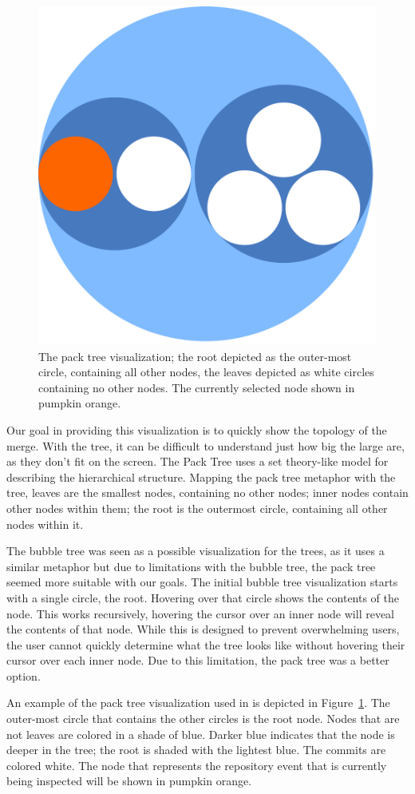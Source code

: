 \begin{figure}[htpb]
  \centering
  \includegraphics[width=0.4\linewidth]{Figures/Linvis/linvis_bubble.pdf}
  \caption{The pack tree visualization; the root depicted as the
    outer-most circle, containing all other nodes, the leaves depicted
    as white circles containing no other nodes. The currently selected
    node shown in pumpkin orange.}
  \label{fig:linvis_bubble_tree}
\end{figure}

Our goal in providing this visualization is to quickly show the topology
of the merge. With the \rt{} tree, it can be difficult to understand
just how big the large \mt{} are, as they don't fit on the screen. The
Pack Tree uses a set theory-like model for describing the hierarchical
structure. Mapping the pack tree metaphor with the tree, leaves are the
smallest nodes, containing no other nodes; inner nodes contain other
nodes within them; the root is the outermost circle, containing all
other nodes within it.

The bubble tree\cite{Boardman2000} was seen as a possible visualization
for the trees, as it uses a similar metaphor but due to limitations with
the bubble tree, the pack tree seemed more suitable with our goals. The
initial bubble tree visualization starts with a single circle, the root.
Hovering over that circle shows the contents of the node. This works
recursively, hovering the cursor over an inner node will reveal the
contents of that node. While this is designed to prevent overwhelming
users, the user cannot quickly determine what the tree looks like
without hovering their cursor over each inner node. Due to this
limitation, the pack tree was a better option.

An example of the pack tree visualization used in \tool{} is depicted in
Figure~\ref{fig:linvis_bubble_tree}. The outer-most circle that contains
the other circles is the root node. Nodes that are not leaves are
colored in a shade of blue. Darker blue indicates that the node is
deeper in the tree; the root is shaded with the lightest blue. The
commits are colored white. The node that represents the repository event
that is currently being inspected will be shown in pumpkin orange.
